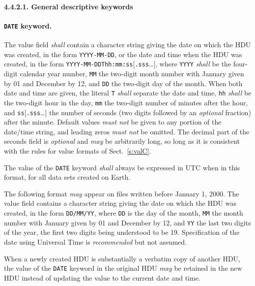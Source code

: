 \documentclass[onecolumn]{aa}
\begin{document}
\paragraph{4.4.2.1. General descriptive keywords}
 \label{s:dhist}
 \paragraph{{\tt DATE} keyword.}
 The value field {\em shall} contain a character 
 string giving 
 the date on which the HDU was created,
 in the form {\tt YYYY-MM-DD}, or the date and time when the HDU was  
 created, in the form {\tt YYYY-MM-DDThh:mm:ss}[{\tt .sss}\ldots],
 where {\tt YYYY} {\em shall} be the four-digit calendar year number, 
 {\tt MM} the two-digit month number
 with January given by 01 and December by 12,
 and {\tt DD} the two-digit day of the month.  When both date and time 
 are given, the literal {\tt T} {\em shall} separate the date and time, 
 {\tt hh} {\em shall} be the two-digit hour in the day, 
 {\tt mm} the two-digit number of minutes after the 
 hour, and {\tt ss}[{\tt .sss}\ldots] the number of 
 seconds (two digits followed by an {\em optional} fraction) after the 
 minute. Default values {\em must not} be given to any portion of the date/time
 string, and leading zeros {\em must not} be omitted.
 The decimal part of the seconds field is {\em optional} and {\em may} be
 arbitrarily long, so long as it is consistent with the rules for 
 value formats of Sect.\ \ref{s:valC}.  

 The value of the {\tt DATE} keyword {\em shall} always 
 be expressed in UTC when in this format, for all data sets created on Earth.  
   
 The following format {\em may} appear on files written before 
 January 1, 2000.  The value field contains a character 
 string giving the date 
 on which the HDU was created, in the form {\tt DD/MM/YY}, 
 where {\tt DD} is the day of the month, 
 {\tt MM} the month number 
 with January given by 01 and December by 12, and {\tt YY} 
 the last two digits of the year, the first two digits being
 understood to be 19. Specification of the date 
 using Universal Time is 
 {\em recommended} but not assumed.  

 When a newly created HDU is substantially a verbatim copy of  
 another HDU, the value of the {\tt DATE} keyword in the original
 HDU {\em may} be retained in the new HDU instead of updating
 the value to the current date and time.
\end{document}
